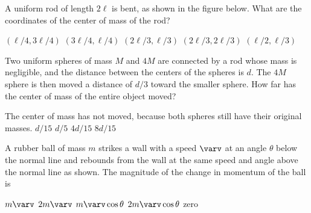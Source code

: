 \documentclass{../../oss-apphys-exam}
\begin{document}
\genheader


\genmultidirections

\gengravity

\raggedcolumns
\begin{multicols*}{2}
  \begin{questions}
    \question A uniform rod of length $2\ell$ is bent, as shown in the figure
    below. What are the coordinates of the center of mass of the rod?
    \begin{center}
    \end{center}
    \begin{choices}
      \choice $(\ell/4,3\ell/4)$
      \correctchoice $(3\ell/4,\ell/4)$
      \choice $(2\ell/3,\ell/3)$
      \choice $(2\ell/3,2\ell/3)$
      \choice $(\ell/2,\ell/3)$
    \end{choices}

    \question Two uniform spheres of mass $M$ and $4M$ are connected by a rod
    whose mass is negligible, and the distance between the centers of the
    spheres is $d$. The $4M$ sphere is then moved a distance of $d/3$ toward the
    smaller sphere. How far has the center of mass of the entire object moved?
    \begin{choices}
      \choice The center of mass has not moved, because both spheres still have
      their original masses.
      \choice $d/15$
      \choice $d/5$
      \correctchoice $4d/15$
      \choice $8d/15$
    \end{choices}
    \columnbreak
    
    \question A rubber ball of mass $m$ strikes a wall with a speed $\varv$ at
    an angle $\theta$ below the normal line and rebounds from the wall at the
    same speed and angle above the normal line as shown. The magnitude of the
    change in momentum of the ball is
    \begin{center}
    \end{center}
    \begin{choices}
      \choice $m\varv$
      \choice $2m\varv$
      \choice $m\varv\cos\theta$
      \choice $2m\varv\cos\theta$
      \choice  zero
    \end{choices}
    

\end{questions}
\end{multicols*}
\end{document}
